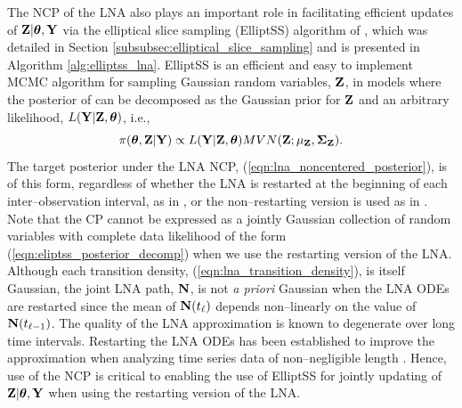 The NCP of the LNA also plays an important role in facilitating efficient updates of $ \mathbf{Z}|\boldsymbol{\theta},\mathbf{Y} $ via the elliptical slice sampling (ElliptSS) algorithm of \cite{murray2010}, which was detailed in Section \ref{subsubsec:elliptical_slice_sampling} and is presented in Algorithm \ref{alg:elliptss_lna}. ElliptSS is an efficient and easy to implement MCMC algorithm for sampling Gaussian random variables, $ \mathbf{Z} $, in models where the posterior of can be decomposed as the Gaussian prior for $ \mathbf{Z} $ and an arbitrary likelihood, $ L(\mathbf{Y}|\mathbf{Z},\boldsymbol{\theta}) $, i.e.,
\begin{equation}
\label{eqn:eliptss_posterior_decomp}
\pi(\boldsymbol{\theta},\mathbf{Z}|\mathbf{Y})\propto L(\mathbf{Y}|\mathbf{Z},\boldsymbol{\theta})MVN(\mathbf{Z};\mu_{\mathbf{Z}},\boldsymbol{\Sigma}_{\mathbf{Z}}).
\end{equation}
The target posterior under the LNA NCP, (\ref{eqn:lna_noncentered_posterior}), is of this form, regardless of whether the LNA is restarted at the beginning of each inter--observation interval, as in \cite{fearnhead2014}, or the non--restarting version is used as in \cite{komorowski2009}. Note that the CP cannot be expressed as a jointly Gaussian collection of random variables with complete data likelihood of the form (\ref{eqn:eliptss_posterior_decomp}) when we use the restarting version of the LNA. Although each transition density, (\ref{eqn:lna_transition_density}), is itself Gaussian, the joint LNA path, $ \mathbf{N} $, is not \textit{a priori} Gaussian when the LNA ODEs are restarted since the mean of $ \mathbf{N}(t_\ell) $ depends non--linearly on the value of $ \mathbf{N}(t_{\ell-1}) $. The quality of the LNA approximation is known to degenerate over long time intervals. Restarting the LNA ODEs has been established to improve the approximation when analyzing time series data of non--negligible length \cite{fearnhead2014,giagos2010inference}. Hence, use of the NCP is critical to enabling the use of ElliptSS for jointly updating of $ \mathbf{Z}|\boldsymbol{\theta},\mathbf{Y} $ when using the restarting version of the LNA. 

